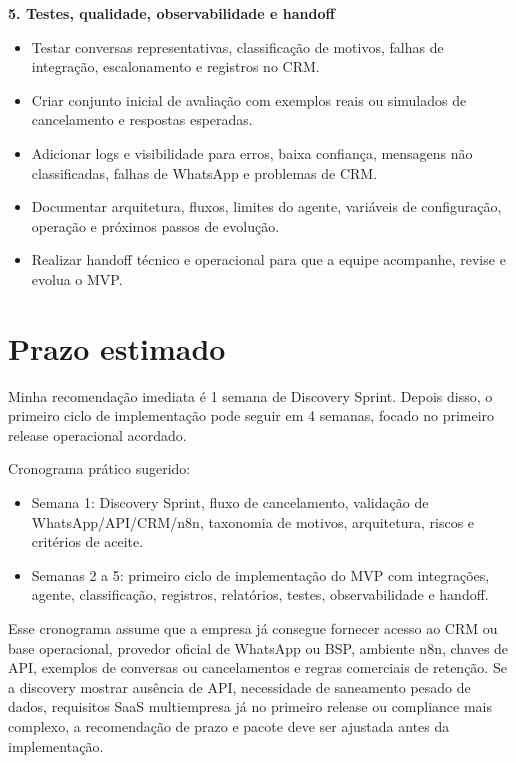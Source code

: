 \documentclass[11pt,a4paper]{article}
\begin{document}
\textbf{5. Testes, qualidade, observabilidade e handoff}\par

\begin{itemize}
\item Testar conversas representativas, classificação de motivos, falhas de integração, escalonamento e registros no CRM.
\item Criar conjunto inicial de avaliação com exemplos reais ou simulados de cancelamento e respostas esperadas.
\item Adicionar logs e visibilidade para erros, baixa confiança, mensagens não classificadas, falhas de WhatsApp e problemas de CRM.
\item Documentar arquitetura, fluxos, limites do agente, variáveis de configuração, operação e próximos passos de evolução.
\item Realizar handoff técnico e operacional para que a equipe acompanhe, revise e evolua o MVP.
\end{itemize}

\section*{Prazo estimado}

Minha recomendação imediata é 1 semana de Discovery Sprint. Depois disso, o primeiro ciclo de implementação pode seguir em 4 semanas, focado no primeiro release operacional acordado.\par

Cronograma prático sugerido:\par

\begin{itemize}
\item Semana 1: Discovery Sprint, fluxo de cancelamento, validação de WhatsApp/API/CRM/n8n, taxonomia de motivos, arquitetura, riscos e critérios de aceite.
\item Semanas 2 a 5: primeiro ciclo de implementação do MVP com integrações, agente, classificação, registros, relatórios, testes, observabilidade e handoff.
\end{itemize}

Esse cronograma assume que a empresa já consegue fornecer acesso ao CRM ou base operacional, provedor oficial de WhatsApp ou BSP, ambiente n8n, chaves de API, exemplos de conversas ou cancelamentos e regras comerciais de retenção. Se a discovery mostrar ausência de API, necessidade de saneamento pesado de dados, requisitos SaaS multiempresa já no primeiro release ou compliance mais complexo, a recomendação de prazo e pacote deve ser ajustada antes da implementação.\par
\end{document}
